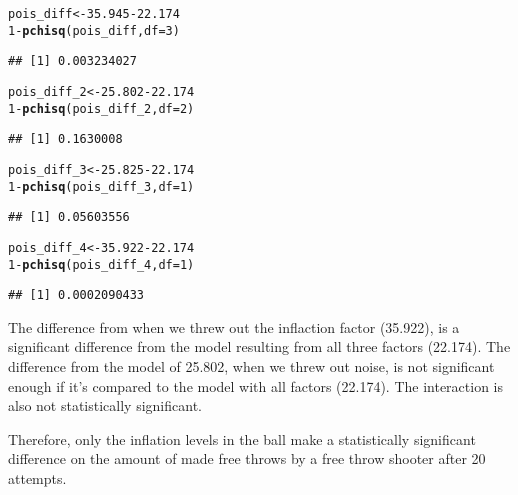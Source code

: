 \documentclass[12pt]{article}\usepackage[]{graphicx}\usepackage[]{color}
\makeatletter
\newcommand{\hlnum}[1]{\textcolor[rgb]{0.686,0.059,0.569}{#1}}%
\newcommand{\hlopt}[1]{\textcolor[rgb]{0,0,0}{#1}}%
\newcommand{\hlstd}[1]{\textcolor[rgb]{0.345,0.345,0.345}{#1}}%
\newcommand{\hlkwb}[1]{\textcolor[rgb]{0.69,0.353,0.396}{#1}}%
\newcommand{\hlkwc}[1]{\textcolor[rgb]{0.333,0.667,0.333}{#1}}%
\newcommand{\hlkwd}[1]{\textcolor[rgb]{0.737,0.353,0.396}{\textbf{#1}}}%
\newenvironment{kframe}{%
 \def\at@end@of@kframe{}%
 \ifinner\ifhmode%
  \def\at@end@of@kframe{\end{minipage}}%
  \begin{minipage}{\columnwidth}%
 \fi\fi%
 \def\FrameCommand##1{\hskip\@totalleftmargin \hskip-\fboxsep
 \colorbox{shadecolor}{##1}\hskip-\fboxsep
     \hskip-\linewidth \hskip-\@totalleftmargin \hskip\columnwidth}%
 \MakeFramed {\advance\hsize-\width
   \@totalleftmargin\z@ \linewidth\hsize
   \@setminipage}}%
 {\par\unskip\endMakeFramed%
 \at@end@of@kframe}
\newenvironment{knitrout}{}{} %
\makeatother
\begin{document}
\begin{knitrout}
\color{fgcolor}\begin{kframe}
\begin{alltt}
\hlstd{pois_diff} \hlkwb{<-} \hlnum{35.945} \hlopt{-} \hlnum{22.174}
\hlnum{1} \hlopt{-} \hlkwd{pchisq}\hlstd{(pois_diff,} \hlkwc{df}\hlstd{=}\hlnum{3}\hlstd{)}
\end{alltt}
\begin{verbatim}
## [1] 0.003234027
\end{verbatim}
\begin{alltt}
\hlstd{pois_diff_2} \hlkwb{<-} \hlnum{25.802} \hlopt{-} \hlnum{22.174}
\hlnum{1} \hlopt{-} \hlkwd{pchisq}\hlstd{(pois_diff_2,} \hlkwc{df}\hlstd{=}\hlnum{2}\hlstd{)}
\end{alltt}
\begin{verbatim}
## [1] 0.1630008
\end{verbatim}
\begin{alltt}
\hlstd{pois_diff_3} \hlkwb{<-} \hlnum{25.825} \hlopt{-} \hlnum{22.174}
\hlnum{1} \hlopt{-} \hlkwd{pchisq}\hlstd{(pois_diff_3,} \hlkwc{df}\hlstd{=}\hlnum{1}\hlstd{)}
\end{alltt}
\begin{verbatim}
## [1] 0.05603556
\end{verbatim}
\begin{alltt}
\hlstd{pois_diff_4} \hlkwb{<-} \hlnum{35.922} \hlopt{-} \hlnum{22.174}
\hlnum{1} \hlopt{-} \hlkwd{pchisq}\hlstd{(pois_diff_4,} \hlkwc{df}\hlstd{=}\hlnum{1}\hlstd{)}
\end{alltt}
\begin{verbatim}
## [1] 0.0002090433
\end{verbatim}
\end{kframe}
\end{knitrout}

The difference from when we threw out the inflaction factor (35.922), is a significant difference from the model resulting from all three factors (22.174). The difference from the model of 25.802, when we threw out noise, is not significant enough if it's compared to the model with all factors (22.174). The interaction is also not statistically significant. 

Therefore, only the inflation levels in the ball make a statistically significant difference on the amount of made free throws by a free throw shooter after 20 attempts. 
\end{document}
